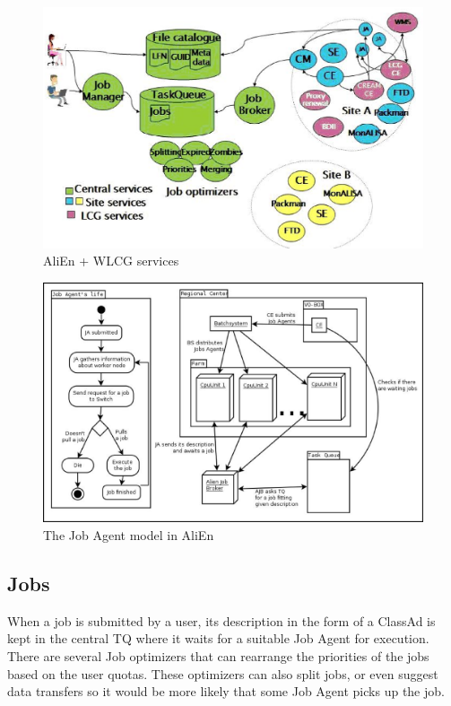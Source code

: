 \begin{figure}[htb] %
\centering
\includegraphics[width=13cm]{fig16.eps} %
\caption{AliEn + WLCG services}\label{fig16}
\end{figure}



\begin{figure}[htb] %
\centering
\includegraphics[width=13cm]{fig17.eps} %
\caption{The Job Agent model in AliEn}\label{fig17}
\end{figure}



\subsection{Jobs}
%
When a job is submitted by a user, its description in the form of a
ClassAd is kept in the central TQ  where it waits for a suitable Job Agent for execution.  
There are several Job optimizers that can rearrange the priorities of the jobs based 
on the user quotas. These optimizers can also split jobs,  or even 
suggest data transfers so it would be more likely that some Job
Agent picks up the job.

